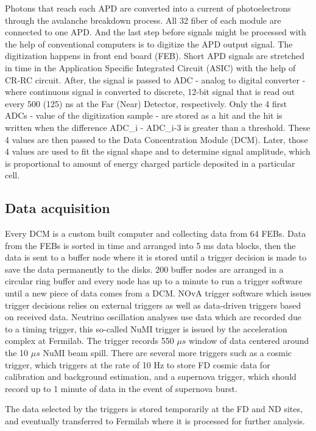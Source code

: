 Photons that reach each APD are converted into a current of photoelectrons through the avalanche breakdown 
process. All 32 fiber of each module are connected to one APD. And the last step before signals might be 
processed with the 
help of conventional computers is to digitize the APD output signal. The digitization happens in
front end board (FEB). Short APD signals are stretched in time in the Application Specific 
Integrated Circuit (ASIC) with the help of CR-RC circuit. After, the signal is passed to ADC - 
analog to digital converter - where continuous signal is converted to discrete, 12-bit signal
that is read out every 500 (125) ns at the Far (Near) Detector, respectively. Only the 4 first ADCs - 
value of the digitization sample - are stored as a hit and the hit is written when the difference
\be
ADC_i - ADC_{i-3}
\ee
is greater than a threshold. These 4 values are then passed to the Data Concentration Module (DCM). 
Later, those 4 values are used to fit the signal shape and to determine signal amplitude, which 
is proportional to amount of energy charged particle deposited in a particular cell.

\subsection{Data acquisition}
Every DCM is a custom built computer and collecting data from 64 FEBs. Data from the FEBs
is sorted in time and arranged into 5 ms data blocks, then the data is sent to a buffer node where it 
is stored until a trigger decision is made to save the data permanently to the disks. 200 buffer nodes 
are arranged in a circular ring buffer and every node has up to a minute to run a trigger software 
until a new piece of data comes from a DCM. NOvA trigger software which issues trigger decisions relies
on external triggers as well as data-driven triggers based on received data. Neutrino oscillation
analyses use data which are recorded due to a timing trigger, this so-called NuMI trigger 
is issued by the acceleration complex at Fermilab. The trigger records 550 $\mu s$ window of data centered 
around the 10 $\mu s$ NuMI beam spill. There are several more triggers such as a cosmic trigger, which 
triggers at the rate of 10 Hz to store FD cosmic data for calibration and background estimation, and a 
supernova trigger, which should record up to 1 minute of data in the event of supernova burst.

The data selected by the triggers is stored temporarily at the FD and ND sites, and eventually transferred
to Fermilab where it is processed for further analysis.

